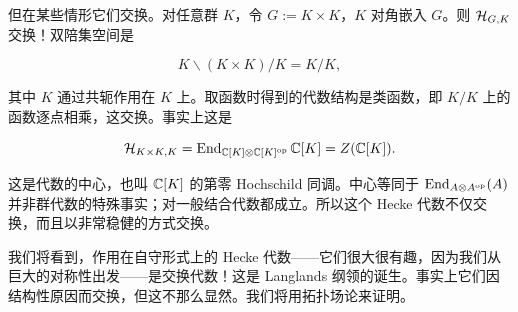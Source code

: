 但在某些情形它们交换。对任意群 $K$，令 $G:=K\times K$，$K$ 对角嵌入 $G$。则 $\mathcal{H}_{G,K}$ 交换！双陪集空间是

\[K\backslash (K\times K)/K=K/K,\]

其中 $K$ 通过共轭作用在 $K$ 上。取函数时得到的代数结构是类函数，即 $K/K$ 上的函数逐点相乘，这交换。事实上这是

\[\mathcal{H}_{K\times K,K}=\operatorname{End}_{\mathbb{C}[K]\otimes\mathbb{C}[K]^{\mathrm{op}}}\mathbb{C}[K]=Z(\mathbb{C}[K]).\]

这是代数的中心，也叫 $\mathbb{C}[K]$ 的第零 Hochschild 同调。中心等同于 $\operatorname{End}_{A\otimes A^{\mathrm{op}}}(A)$ 并非群代数的特殊事实；对一般结合代数都成立。所以这个 Hecke 代数不仅交换，而且以非常稳健的方式交换。

我们将看到，作用在自守形式上的 Hecke 代数——它们很大很有趣，因为我们从巨大的对称性出发——是交换代数！这是 Langlands 纲领的诞生。事实上它们因结构性原因而交换，但这不那么显然。我们将用拓扑场论来证明。

